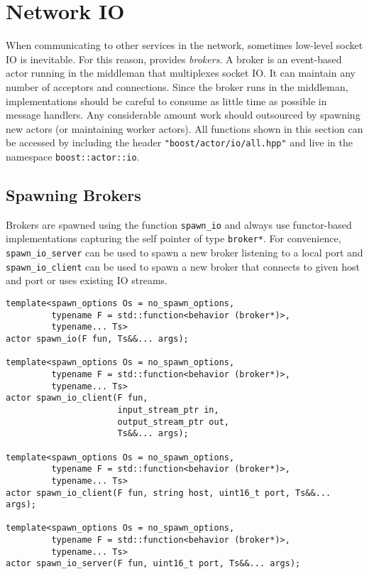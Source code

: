 \section{Network IO}
\label{Sec::NetworkIO}

When communicating to other services in the network, sometimes low-level socket IO is inevitable.
For this reason, \lib provides \emph{brokers}.
A broker is an event-based actor running in the middleman that multiplexes socket IO.
It can maintain any number of acceptors and connections.
Since the broker runs in the middleman, implementations should be careful to consume as little time as possible in message handlers.
Any considerable amount work should outsourced by spawning new actors (or maintaining worker actors).
All functions shown in this section can be accessed by including the header \lstinline^"boost/actor/io/all.hpp"^ and live in the namespace \lstinline^boost::actor::io^.


\subsection{Spawning Brokers}

Brokers are spawned using the function \lstinline^spawn_io^ and always use functor-based implementations capturing the self pointer of type \lstinline^broker*^.
For convenience, \lstinline^spawn_io_server^ can be used to spawn a new broker listening to a local port and \lstinline^spawn_io_client^ can be used to spawn a new broker that connects to given host and port or uses existing IO streams.

\begin{lstlisting}
template<spawn_options Os = no_spawn_options,
         typename F = std::function<behavior (broker*)>,
         typename... Ts>
actor spawn_io(F fun, Ts&&... args);

template<spawn_options Os = no_spawn_options,
         typename F = std::function<behavior (broker*)>,
         typename... Ts>
actor spawn_io_client(F fun,
                      input_stream_ptr in,
                      output_stream_ptr out,
                      Ts&&... args);

template<spawn_options Os = no_spawn_options,
         typename F = std::function<behavior (broker*)>,
         typename... Ts>
actor spawn_io_client(F fun, string host, uint16_t port, Ts&&... args);

template<spawn_options Os = no_spawn_options,
         typename F = std::function<behavior (broker*)>,
         typename... Ts>
actor spawn_io_server(F fun, uint16_t port, Ts&&... args);
\end{lstlisting}


